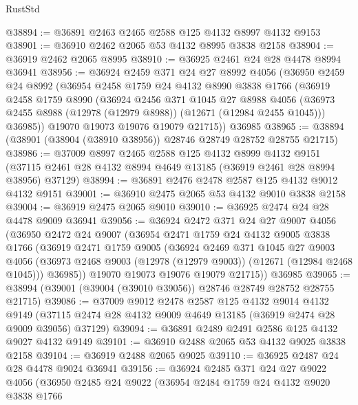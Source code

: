 \begin{lexlean}{RustStd}
\begin{coremodule}
@38894 := @36891 @2463 @2465 @2588 @125 @4132 @8997 @4132 @9153
@38901 := @36910 @2462 @2065 @53 @4132 @8995 @3838 @2158
@38904 := @36919 @2462 @2065 @8995
@38910 := @36925 @2461 @24 @28 @4478 @8994 @36941
@38956 := @36924
    @2459
    @371
    @24
    @27
    @8992
    @4056
    (@36950
      @2459
      @24
      @8992
      (@36954
        @2458
        @1759
        @24
        @4132
        @8990
        @3838
        @1766
        (@36919
          @2458
          @1759
          @8990
          (@36924
            @2456
            @371
            @1045
            @27
            @8988
            @4056
            (@36973 @2455 @8988 (@12978 (@12979 @8988)) (@12671 (@12984 @2455 @1045)))
            @36985))
        @19070
        @19073
        @19076
        @19079
        @21715))
    @36985
@38965 := @38894 (@38901 (@38904 (@38910 @38956)) @28746 @28749 @28752 @28755 @21715)
@38986 := @37009
    @8997
    @2465
    @2588
    @125
    @4132
    @8999
    @4132
    @9151
    (@37115 @2461 @28 @4132 @8994 @4649 @13185 (@36919 @2461 @28 @8994 @38956) @37129)
@38994 := @36891 @2476 @2478 @2587 @125 @4132 @9012 @4132 @9151
@39001 := @36910 @2475 @2065 @53 @4132 @9010 @3838 @2158
@39004 := @36919 @2475 @2065 @9010
@39010 := @36925 @2474 @24 @28 @4478 @9009 @36941
@39056 := @36924
    @2472
    @371
    @24
    @27
    @9007
    @4056
    (@36950
      @2472
      @24
      @9007
      (@36954
        @2471
        @1759
        @24
        @4132
        @9005
        @3838
        @1766
        (@36919
          @2471
          @1759
          @9005
          (@36924
            @2469
            @371
            @1045
            @27
            @9003
            @4056
            (@36973 @2468 @9003 (@12978 (@12979 @9003)) (@12671 (@12984 @2468 @1045)))
            @36985))
        @19070
        @19073
        @19076
        @19079
        @21715))
    @36985
@39065 := @38994 (@39001 (@39004 (@39010 @39056)) @28746 @28749 @28752 @28755 @21715)
@39086 := @37009
    @9012
    @2478
    @2587
    @125
    @4132
    @9014
    @4132
    @9149
    (@37115 @2474 @28 @4132 @9009 @4649 @13185 (@36919 @2474 @28 @9009 @39056) @37129)
@39094 := @36891 @2489 @2491 @2586 @125 @4132 @9027 @4132 @9149
@39101 := @36910 @2488 @2065 @53 @4132 @9025 @3838 @2158
@39104 := @36919 @2488 @2065 @9025
@39110 := @36925 @2487 @24 @28 @4478 @9024 @36941
@39156 := @36924
    @2485
    @371
    @24
    @27
    @9022
    @4056
    (@36950
      @2485
      @24
      @9022
      (@36954
        @2484
        @1759
        @24
        @4132
        @9020
        @3838
        @1766

\end{coremodule}
\end{lexlean}
